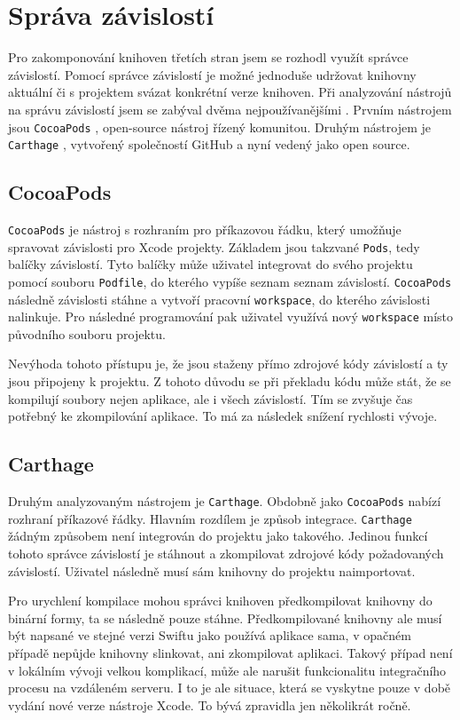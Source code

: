 \section{Správa závislostí}\label{analyza-sprava-zavislosti}

Pro zakomponování knihoven třetích stran jsem se rozhodl využít správce závislostí.
Pomocí správce závislostí je možné jednoduše udržovat knihovny aktuální či s projektem svázat konkrétní verze knihoven.
Při analyzování nástrojů na správu závislostí jsem se zabýval dvěma nejpoužívanějšími \cite{shashikantjagtap-swift-dependency-management}.
Prvním nástrojem jsou \texttt{CocoaPods} \cite{cocoapods-about}, open-source nástroj řízený komunitou.
Druhým nástrojem je \texttt{Carthage} \cite{github-carthage}, vytvořený společností GitHub a nyní vedený jako open source.

\subsection{CocoaPods}

\texttt{CocoaPods} je nástroj s rozhraním pro příkazovou řádku, který umožňuje spravovat závislosti pro Xcode projekty.
Základem jsou takzvané \texttt{Pods}, tedy balíčky závislostí.
Tyto balíčky může uživatel integrovat do svého projektu pomocí souboru \texttt{Podfile}, do kterého vypíše seznam seznam závislostí.
\texttt{CocoaPods} následně závislosti stáhne a vytvoří pracovní \texttt{workspace}, do kterého závislosti nalinkuje.
Pro následné programování pak uživatel využívá nový \texttt{workspace} místo původního souboru projektu.

Nevýhoda tohoto přístupu je, že jsou staženy přímo zdrojové kódy závislostí a ty jsou připojeny k projektu.
Z tohoto důvodu se při překladu kódu může stát, že se kompilují soubory nejen aplikace, ale i všech závislostí.
Tím se zvyšuje čas potřebný ke zkompilování aplikace.
To má za následek snížení rychlosti vývoje.

\subsection{Carthage}

Druhým analyzovaným nástrojem je \texttt{Carthage}.
Obdobně jako \texttt{CocoaPods} nabízí rozhraní příkazové řádky.
Hlavním rozdílem je způsob integrace.
\texttt{Carthage} žádným způsobem není integrován do projektu jako takového.
Jedinou funkcí tohoto správce závislostí je stáhnout a zkompilovat zdrojové kódy požadovaných závislostí.
Uživatel následně musí sám knihovny do projektu naimportovat.

Pro urychlení kompilace mohou správci knihoven předkompilovat knihovny do binární formy, ta se následně pouze stáhne.
Předkompilované knihovny ale musí být napsané ve stejné verzi Swiftu jako používá aplikace sama, v opačném případě nepůjde knihovny slinkovat, ani zkompilovat aplikaci.
Takový případ není v lokálním vývoji velkou komplikací, může ale narušit funkcionalitu integračního procesu na vzdáleném serveru.
I to je ale situace, která se vyskytne pouze v době vydání nové verze nástroje Xcode.
To bývá zpravidla jen několikrát ročně.
